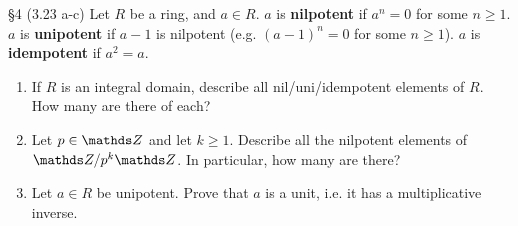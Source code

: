 \documentclass{homework}
\begin{document}
\begin{problem}{\S 4}
  (3.23 a-c) Let $R$ be a ring, and $a\in R$. $a$ is \textbf{nilpotent} if $a^{n}=0$ for some $n\ge
  1$. $a$ is \textbf{unipotent} if $a-1$ is nilpotent (e.g. $(a-1)^n=0$ for some $n\ge 1$). $a$ is
  \textbf{idempotent} if $a^2=a$.
  \begin{enumerate}[label=(\alph*)]
    \item If $R$ is an integral domain, describe all nil/uni/idempotent elements of $R$. How many
      are there of each?
    \item Let $p\in \Z$ and let $k\ge 1$. Describe all the nilpotent elements of $\Z / p^k\Z$. In
      particular, how many are there?
    \item Let $a\in R$ be unipotent. Prove that $a$ is a unit, i.e. it has a multiplicative inverse.
  \end{enumerate}
\end{problem}
\end{document}
